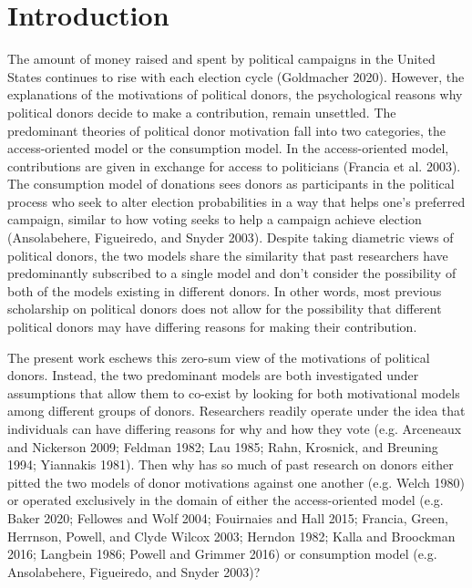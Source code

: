 \documentclass[12pt,]{article}
\begin{document}
\newpage

\hypertarget{introduction}{%
\section{Introduction}\label{introduction}}

The amount of money raised and spent by political campaigns in the
United States continues to rise with each election cycle (Goldmacher
2020). However, the explanations of the motivations of political donors,
the psychological reasons why political donors decide to make a
contribution, remain unsettled. The predominant theories of political
donor motivation fall into two categories, the access-oriented model or
the consumption model. In the access-oriented model, contributions are
given in exchange for access to politicians (Francia et al. 2003). The
consumption model of donations sees donors as participants in the
political process who seek to alter election probabilities in a way that
helps one's preferred campaign, similar to how voting seeks to help a
campaign achieve election (Ansolabehere, Figueiredo, and Snyder 2003).
Despite taking diametric views of political donors, the two models share
the similarity that past researchers have predominantly subscribed to a
single model and don't consider the possibility of both of the models
existing in different donors. In other words, most previous scholarship
on political donors does not allow for the possibility that different
political donors may have differing reasons for making their
contribution.

The present work eschews this zero-sum view of the motivations of
political donors. Instead, the two predominant models are both
investigated under assumptions that allow them to co-exist by looking
for both motivational models among different groups of donors.
Researchers readily operate under the idea that individuals can have
differing reasons for why and how they vote (e.g. Arceneaux and
Nickerson 2009; Feldman 1982; Lau 1985; Rahn, Krosnick, and Breuning
1994; Yiannakis 1981). Then why has so much of past research on donors
either pitted the two models of donor motivations against one another
(e.g. Welch 1980) or operated exclusively in the domain of either the
access-oriented model (e.g. Baker 2020; Fellowes and Wolf 2004;
Fouirnaies and Hall 2015; Francia, Green, Herrnson, Powell, and Clyde
Wilcox 2003; Herndon 1982; Kalla and Broockman 2016; Langbein 1986;
Powell and Grimmer 2016) or consumption model (e.g. Ansolabehere,
Figueiredo, and Snyder 2003)?
\end{document}
